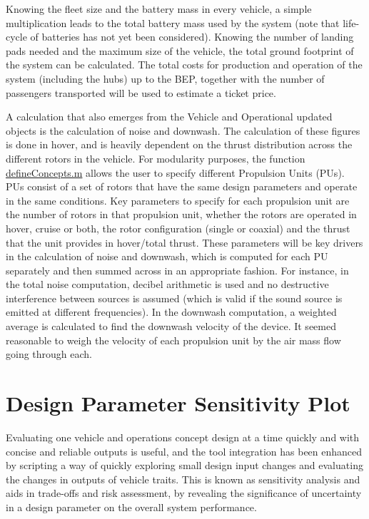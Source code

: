 Knowing the fleet size and the battery mass in every vehicle, a simple multiplication leads to the total battery mass used by the system (note that life-cycle of batteries has not yet been considered). Knowing the number of landing pads needed and the maximum size of the vehicle, the total ground footprint of the system can be calculated. The total costs for production and operation of the system (including the hubs) up to the BEP, together with the number of passengers transported will be used to estimate a ticket price.

A calculation that also emerges from the Vehicle and Operational updated objects is the calculation of noise and downwash. The calculation of these figures is done in hover, and is heavily dependent on the thrust distribution across the different rotors in the vehicle. For modularity purposes, the function \url{defineConcepts.m} allows the user to specify different Propulsion Units (PUs). PUs consist of a set of rotors that have the same design parameters and operate in the same conditions. Key parameters to specify for each propulsion unit are the number of rotors in that propulsion unit, whether the rotors are operated in hover, cruise or both, the rotor configuration (single or coaxial) and the thrust that the unit provides in hover/total thrust. These parameters will be key drivers in the calculation of noise and downwash, which is computed for each PU separately and then summed across in an appropriate fashion. For instance, in the total noise computation, decibel arithmetic is used and no destructive interference between sources is assumed (which is valid if the sound source is emitted at different frequencies). In the downwash computation, a weighted average is calculated to find the downwash velocity of the device. It seemed reasonable to weigh the velocity of each propulsion unit by the air mass flow going through each.



\section{Design Parameter Sensitivity Plot} 
\label{sec:sensitivityplot}

Evaluating one vehicle and operations concept design at a time quickly and with concise and reliable outputs is useful, and the tool integration has been enhanced by scripting a way of quickly exploring small design input changes and evaluating the changes in outputs of vehicle traits. This is known as sensitivity analysis and aids in trade-offs and risk assessment, by revealing the significance of uncertainty in a design parameter on the overall system performance.

